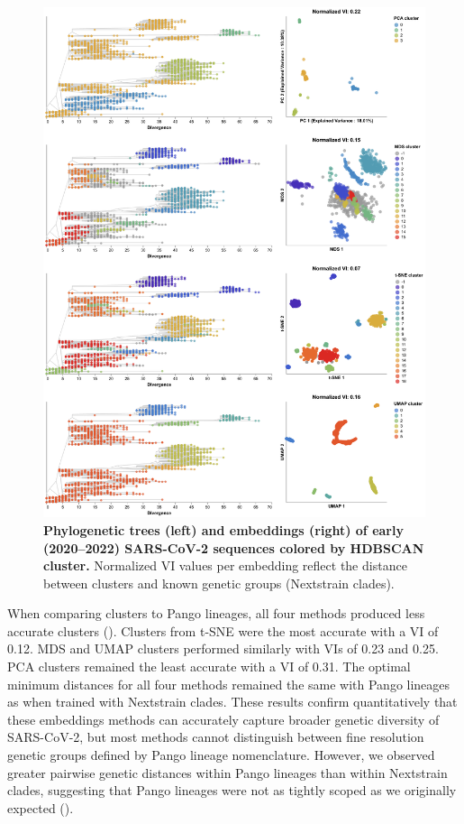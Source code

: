 \documentclass[10pt,letterpaper]{article}
\begin{document}
\begin{figure}[!h]
\includegraphics[width=\columnwidth]{figures/sarscov2-embeddings-by-cluster-vs-Nextstrain_clade.png}
\caption{{\bf Phylogenetic trees (left) and embeddings (right) of early (2020--2022) SARS-CoV-2 sequences colored by HDBSCAN cluster.}
  Normalized VI values per embedding reflect the distance between clusters and known genetic groups (Nextstrain clades).
}
\label{fig:sars-cov-2-2020-2022-clusters-vs-Nextstrain-clade}
\end{figure}

When comparing clusters to Pango lineages, all four methods produced less accurate clusters ().
Clusters from t-SNE were the most accurate with a VI of 0.12.
MDS and UMAP clusters performed similarly with VIs of 0.23 and 0.25.
PCA clusters remained the least accurate with a VI of 0.31.
The optimal minimum distances for all four methods remained the same with Pango lineages as when trained with Nextstrain clades.
These results confirm quantitatively that these embeddings methods can accurately capture broader genetic diversity of SARS-CoV-2, but most methods cannot distinguish between fine resolution genetic groups defined by Pango lineage nomenclature.
However, we observed greater pairwise genetic distances within Pango lineages than within Nextstrain clades, suggesting that Pango lineages were not as tightly scoped as we originally expected ().
\end{document}
